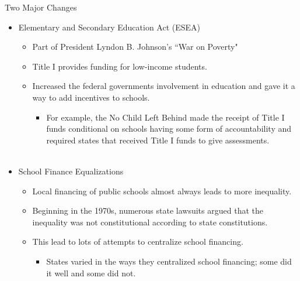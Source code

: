 \documentclass[handout]{beamer}
\begin{document}
\begin{frame}{Two Major Changes}
\begin{itemize}
\item Elementary and Secondary Education Act (ESEA)
	\begin{itemize}
	\item Part of President Lyndon B. Johnson's ``War on Poverty"
	\item Title I provides funding for low-income students. 
	\item Increased the federal governments involvement in education and gave it a way to add incentives to schools. 
		\begin{itemize}
		\item For example, the No Child Left Behind made the receipt of Title I funds conditional on schools having some form of accountability and required states that received Title I funds to give assessments. \\~\\
		\end{itemize}
	\end{itemize}
\item School Finance Equalizations
	\begin{itemize}
	\item Local financing of public schools almost always leads to more inequality. 
	\item Beginning in the 1970s, numerous state lawsuits argued that the inequality was not constitutional according to state constitutions. 
	\item This lead to lots of attempts to centralize school financing. 
		\begin{itemize}
		\item States varied in the ways they centralized school financing; some did it well and some did not. \\~\\
		\end{itemize}
	\end{itemize}
\end{itemize}
\end{frame}
\end{document}
